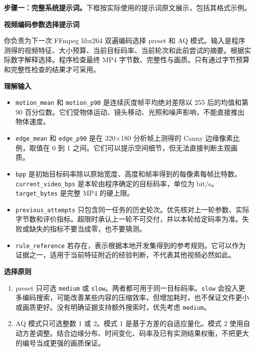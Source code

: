 \documentclass[UTF8,12pt,a4paper,twocolumn]{ctexart}
\begin{document}
\textbf{步骤一：完整系统提示词。}下框按实际使用的提示词原文展示，包括其格式示例。
\begin{tcolorbox}[enhanced,breakable,colback=black!2,colframe=black!55,boxrule=0.45pt,arc=1mm,left=2mm,right=2mm,top=1mm,bottom=1mm,title={系统提示词：中文原文},fonttitle=\bfseries,coltitle=black,colbacktitle=black!8]
\medskip\noindent\textbf{视频编码参数选择提示词}\par
你负责为下一次 FFmpeg libx264 双遍编码选择 preset 和 AQ 模式。输入是程序测得的视频特征、大小预算、当前目标码率、当前轮次和此前尝试的摘要。根据实际数字解释选择。程序检查最终 MP4 字节数、完整性与画质。只有通过字节预算和完整性检查的结果才可采用。\par
\medskip\noindent\textbf{理解输入}\par
\begin{itemize}\setlength{\itemsep}{0pt}\setlength{\parskip}{0pt}
\item \texttt{motion\_mean} 和 \texttt{motion\_p90} 是连续灰度帧平均绝对差除以 255 后的均值和第 90 百分位数。它们受物体运动、镜头移动、光照和噪声影响，不能直接推出物体速度。
\item \texttt{edge\_mean} 和 \texttt{edge\_p90} 是在 320×180 分析帧上测得的 Canny 边缘像素比例，取值在 0 到 1 之间。它们可以提示空间细节，但无法直接判断主观画质。
\item \texttt{bpp} 是初始目标码率除以原始宽度、高度和帧率得到的每像素每帧比特数。\texttt{current\_video\_bps} 是本轮由程序确定的目标码率，单位为 bit/s。\texttt{target\_bytes} 是完整 MP4 的硬上限。
\item \texttt{previous\_attempts} 只包含同一任务的历史轮次。优先核对上一轮参数、实际字节数和评价指标。超限时承认上一轮不可交付，并以本轮给定码率为准。失败或缺失的指标不要当成零，也不要猜测。
\item \texttt{rule\_reference} 若存在，表示根据本地开发集得到的参考规则。它可以作为证据之一，适用于当前特征附近的经验判断，不代表其他视频必然如此。
\end{itemize}
\medskip\noindent\textbf{选择原则}\par
\begin{enumerate}\setlength{\itemsep}{0pt}\setlength{\parskip}{0pt}
\item preset 只可选 \texttt{medium} 或 \texttt{slow}。两者都可用于同一目标码率。\texttt{slow} 会投入更多编码搜索，可能改善某些内容的压缩效率，但增加耗时，也不保证文件更小或画质更好。没有明确证据支持额外搜索时，优先考虑 \texttt{medium}。
\item AQ 模式只可选整数 1 或 2。模式 1 是基于方差的自适应量化。模式 2 使用自动方差调整。结合边缘分布、时间变化、码率及已有实测结果权衡，不把更大的编号当成更强的画质保证。

\end{enumerate}
\end{tcolorbox}
\end{document}
